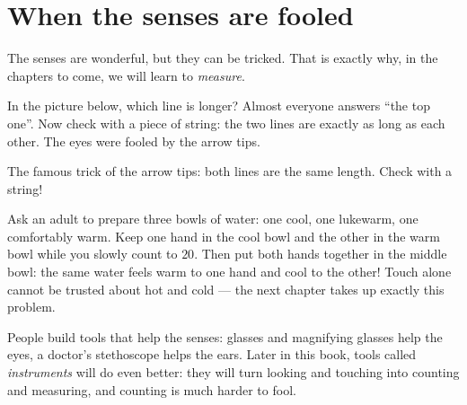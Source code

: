 \section{When the senses are fooled}

The senses are wonderful, but they can be tricked. That is exactly
why, in the chapters to come, we will learn to \emph{measure}.

\begin{example}\label{ex:g1:five-senses:lines}
In the picture below, which line is longer? Almost everyone answers
``the top one''. Now check with a piece of string: the two lines are
exactly as long as each other. The eyes were fooled by the arrow
tips.
\end{example}

\begin{omfigure}

{\small The famous trick of the arrow tips: both lines are the same
length. Check with a string!}
\end{omfigure}

\begin{example}\label{ex:g1:five-senses:bowls}
Ask an adult to prepare three bowls of water: one cool, one lukewarm,
one comfortably warm. Keep one hand in the cool bowl and the other in
the warm bowl while you slowly count to $20$. Then put both hands
together in the middle bowl: the same water feels warm to one hand
and cool to the other! Touch alone cannot be trusted about hot and
cold --- the next chapter takes up exactly this problem.
\end{example}

\begin{remark}\label{rem:g1:five-senses:tools}
People build tools that help the senses: glasses and magnifying
glasses help the eyes, a doctor's stethoscope helps the ears. Later
in this book, tools called \emph{instruments} will do even better:
they will turn looking and touching into counting and measuring, and
counting is much harder to fool.
\end{remark}

